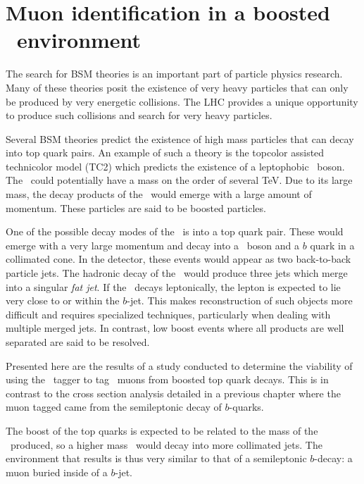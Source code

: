 \newcommand{\kT}{\ensuremath{k_{\textrm{T}}}}
\newcommand{\mzp}{\ensuremath{m_{\Zprime}}}
\newcommand{\eff}[2]{\ensuremath{\epsilon_{#1}^{#2}}}

\chapter{Muon identification in a boosted \ttbar\ environment}
\label{ch:Boosted}

The search for BSM theories is an important part of particle physics research. Many of these theories posit the existence of very heavy particles that can only be produced by very energetic collisions. The LHC provides a unique opportunity to produce such collisions and search for very heavy particles. 

Several BSM theories predict the existence of high mass particles that can decay into top quark pairs. An example of such a theory is the topcolor assisted technicolor model (TC2) which predicts the existence of a leptophobic \Zprime\ boson. The \Zprime\ could potentially have a mass on the order of several \si{TeV}. Due to its large mass, the decay products of the \Zprime\ would emerge with a large amount of momentum. These particles are said to be boosted particles.

One of the possible decay modes of the \Zprime\ is into a top quark pair. These would emerge with a very large momentum and decay into a \W\ boson and a $b$ quark in a collimated cone. In the detector, these events would appear as two back-to-back particle jets. The hadronic decay of the \W\ would produce three jets which merge into a singular \emph{fat jet}. If the \W\ decays leptonically, the lepton is expected to lie very close to or within the $b$-jet. This makes reconstruction of such objects more difficult and requires specialized techniques, particularly when dealing with multiple merged jets. In contrast, low boost events where all products are well separated are said to be resolved.

Presented here are the results of a study conducted to determine the viability of using the \xsm\ tagger to tag \W\ muons from boosted top quark decays. This is in contrast to the cross section analysis detailed in a previous chapter where the muon tagged came from the semileptonic decay of $b$-quarks.

The boost of the top quarks is expected to be related to the mass of the \Zprime\ produced, so a higher mass \Zprime\ would decay into more collimated jets. The environment that results is thus very similar to that of a semileptonic $b$-decay: a muon buried inside of a $b$-jet.


